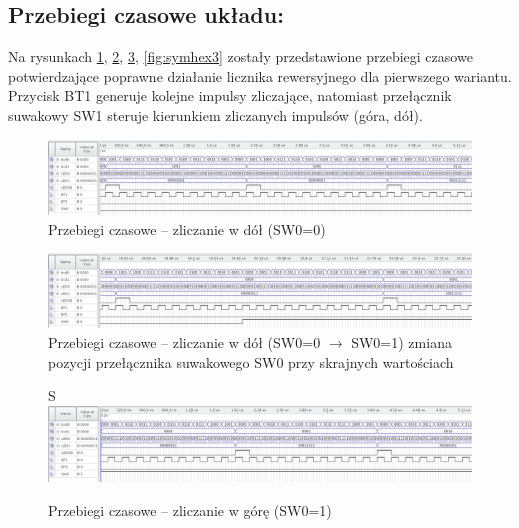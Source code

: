 \documentclass{classrep}
\begin{document}






\subsection{Przebiegi czasowe układu:}
Na rysunkach \ref{fig:symhex0}, \ref{fig:symhex1}, \ref{fig:symhex2}, \ref{fig:symhex3} zostały przedstawione przebiegi czasowe potwierdzające poprawne działanie
licznika rewersyjnego dla pierwszego wariantu. Przycisk BT1 generuje kolejne impulsy zliczające,
natomiast przełącznik suwakowy SW1 steruje kierunkiem zliczanych impulsów (góra, dół).


\begin{figure}[H]
	\centering
	\includegraphics[width=1.0\linewidth]{up_down_1}
	\caption{Przebiegi czasowe – zliczanie w dół (SW0=0)}
	\label{fig:symhex0}
\end{figure}



\begin{figure}[H]
	\centering
	\includegraphics[width=1.0\linewidth]{up_down_2}
	\caption{Przebiegi czasowe – zliczanie w dół (SW0=0 $\longrightarrow$ SW0=1) zmiana pozycji przełącznika suwakowego SW0 przy skrajnych wartościach	}
	\label{fig:symhex1}
\end{figure}



\begin{figure}[H]

S	\centering
	\includegraphics[width=1.0\linewidth]{up_down_inv_1}
	\caption{Przebiegi czasowe – zliczanie w górę (SW0=1) }
	\label{fig:symhex2}
\end{figure}
\end{document}
